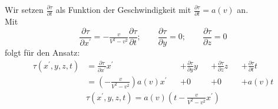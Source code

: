 \documentclass[]{beamer}%
\begin{document}
\begin{frame}
    Wir setzen 
        $\frac{\partial \tau}{\partial t}$
    als Funktion der Geschwindigkeit mit 
        $\frac{\partial \tau}{\partial t} = a(v)$
    an.\\\vspace{20pt}
    Mit
    \begin{equation*}
        \boxed{
            \frac{\partial \tau}{\partial x^\prime} 
        }
        =
        -\tfrac{v}{V^2-v^2}
        \boxed{
            \frac{\partial \tau}{\partial t} 
        }
        ;\quad\quad
        \boxed{
            \frac{\partial \tau}{\partial y} 
        }
        =
            0
        ;\quad\quad
        \boxed{
            \frac{\partial \tau}{\partial z} 
        }
        =
            0
    \end{equation*}
    folgt für den Ansatz:
    \begin{align*}
        \tau    \left( x^\prime, y, z, t\right)
        &=
        \frac{\partial \tau}{\partial x^\prime} x^\prime
        &&+
        \frac{\partial \tau}{\partial y} y
        &&+
        \frac{\partial \tau}{\partial z} z
        &&+
        \frac{\partial \tau}{\partial t} t\\
        &=
        \left( 
            -\tfrac{v}{V^2-v^2}
        \right) a\left( v \right) x^\prime
        &&+
        0 
        &&+
        0 
        &&+
        a\left( v \right) t 
    \end{align*}
    \begin{align*}
        \tau    \left( x^\prime, y, z, t\right)
        =
        a\left( v \right) 
        \left( 
            t-\tfrac{v}{V^2-v^2} x^\prime
        \right)
    \end{align*}
\end{frame}
\end{document}
